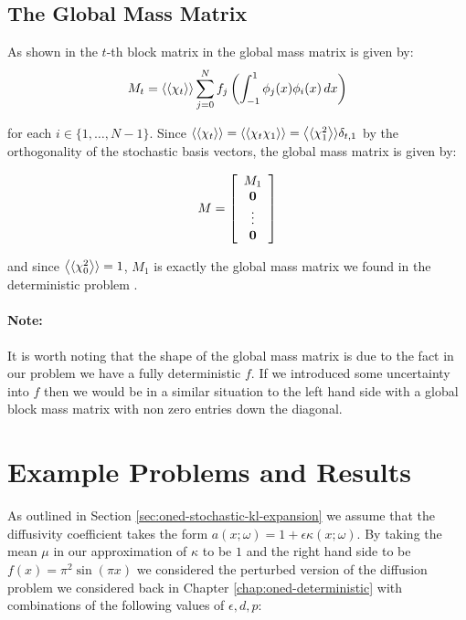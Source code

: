 \subsection{The Global Mass Matrix}

As shown in  the $t$-th block matrix in the
global mass matrix is given by:
\begin{equation}
    M_t = \left\langle\langle\chi_t\right\rangle\rangle\sum_{j=0}^Nf_j\left(
        \int_{-1}^1\phi_j(x)\phi_i(x)\, dx\right)
\end{equation}

for each $i \in \{1,\ldots,N-1\}$. Since $\left\langle\langle\chi_t\right\rangle\rangle =
\left\langle\langle\chi_t\chi_1\right\rangle\rangle = \left\langle\langle\chi_1^2\right\rangle\rangle\delta_{t, 1}$ by the orthogonality of
the stochastic basis vectors, the global mass matrix is given by:

\begin{equation}
    M = \left[\begin{array}{c}
        M_1 \\ \mathbf{0} \\ \vdots \\ \mathbf{0}
    \end{array}\right]
\end{equation}

and since $\left\langle\langle\chi_0^2\right\rangle\rangle = 1$, $M_1$ is exactly the global mass matrix we
found in the deterministic problem .

\paragraph{Note:}

It is worth noting that the shape of the global mass matrix is due to the fact
in our problem we have a fully deterministic $f$. If we introduced some
uncertainty into $f$ then we would be in a similar situation to the left hand
side with a global block mass matrix with non zero entries down the diagonal.

\section{Example Problems and Results}

As outlined in Section \ref{sec:oned-stochastic-kl-expansion} we assume that
the diffusivity coefficient takes the form $a(x;\omega) = 1 +
\epsilon\kappa(x;\omega)$. By taking the mean $\mu$ in our approximation of
$\kappa$ to be $1$ and the right hand side to be $f(x) = \pi^2\sin{(\pi x)}$
we considered the perturbed version of the diffusion problem we considered back
in Chapter \ref{chap:oned-deterministic} with combinations of the following
values of $\epsilon, d, p$:

